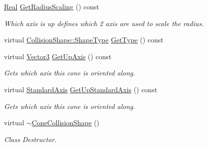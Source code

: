 \begin{DoxyCompactItemize}
\hyperlink{namespaceMezzanine_a726731b1a7df72bf3583e4a97282c6f6}{Real} \hyperlink{classMezzanine_1_1ConeCollisionShape_a6588a43aa775e0f33bc7d9741699fd3f}{GetRadiusScaling} () const 
\begin{DoxyCompactList}\small\item\em Which axis is up defines which 2 axis are used to scale the radius. \item\end{DoxyCompactList}\item 
virtual \hyperlink{classMezzanine_1_1CollisionShape_ad04186055565998879b64176d6dd100d}{CollisionShape::ShapeType} \hyperlink{classMezzanine_1_1ConeCollisionShape_a874892f3aaba7e79200633691037a410}{GetType} () const 
\item 
virtual \hyperlink{classMezzanine_1_1Vector3}{Vector3} \hyperlink{classMezzanine_1_1ConeCollisionShape_aed9f36553311ca8d20ccd0d7a01ec4ee}{GetUpAxis} () const 
\begin{DoxyCompactList}\small\item\em Gets which axis this cone is oriented along. \item\end{DoxyCompactList}\item 
virtual \hyperlink{namespaceMezzanine_ab41a00a8c6a47b576dc987ec34e16ba1}{StandardAxis} \hyperlink{classMezzanine_1_1ConeCollisionShape_aa17fc2f15ba313109ff40f1a66e088be}{GetUpStandardAxis} () const 
\begin{DoxyCompactList}\small\item\em Gets which axis this cone is oriented along. \item\end{DoxyCompactList}\item 
\hypertarget{classMezzanine_1_1ConeCollisionShape_a49236a6396e87f22ec06251de6d3c1fe}{
virtual \hyperlink{classMezzanine_1_1ConeCollisionShape_a49236a6396e87f22ec06251de6d3c1fe}{$\sim$ConeCollisionShape} ()}
\label{classMezzanine_1_1ConeCollisionShape_a49236a6396e87f22ec06251de6d3c1fe}

\begin{DoxyCompactList}\small\item\em Class Destructor. \item\end{DoxyCompactList}\end{DoxyCompactItemize}
